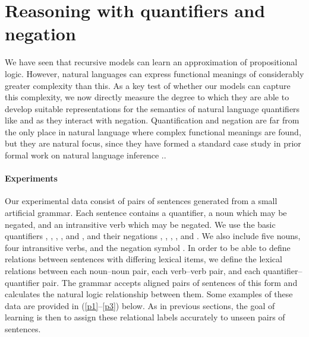 \section{Reasoning with quantifiers and negation}\label{sec:quantifiers}

We have seen that recursive models can learn an approximation of propositional
logic.  However, natural languages can express functional meanings of
considerably greater complexity than this.  As a key test of whether our models 
can capture this complexity, we now directly measure the degree to which they are able to
develop suitable representations for the semantics of natural language
quantifiers like  and  as they interact with negation. Quantification 
and negation are far from the only place in natural language where complex functional meanings
are found, but they are natural focus, since they have
formed a standard case study in prior formal work on natural
language inference \cite{Icard:Moss:2013:LILT}..

\paragraph{Experiments}
Our experimental data consist of pairs of sentences generated from a
small artificial grammar. Each sentence contains a quantifier, a noun
which may be negated, and an intransitive verb which may be
negated. We use the basic quantifiers , , ,
, and , and their negations , ,
, , and . We also
include five nouns, four intransitive verbs, and the negation symbol
. In order to be able to define relations between sentences
with differing lexical items, we define the lexical relations between
each noun--noun pair, each verb--verb pair, and each
quantifier--quantifier pair. The grammar accepts aligned pairs of
sentences of this form and calculates the natural logic relationship
between them.  Some examples of these data are provided in (\ref{p1}--\ref{p3}) below.
  As in previous sections, the goal of
learning is then to assign these relational labels accurately to
unseen pairs of sentences.



